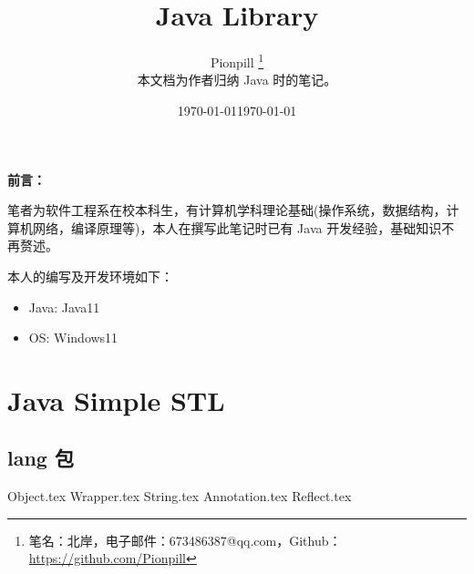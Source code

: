 \documentclass{PionpillNote-book}
\title{Java Library}
\author{
    Pionpill \footnote{笔名：北岸，电子邮件：673486387@qq.com，Github：\url{https://github.com/Pionpill}} \\
    本文档为作者归纳 Java 时的笔记。\\
}
\date{\today}
\begin{document}
\pagestyle{plain}
\maketitle

\noindent\textbf{前言：}

笔者为软件工程系在校本科生，有计算机学科理论基础(操作系统，数据结构，计算机网络，编译原理等)，本人在撰写此笔记时已有 Java 开发经验，基础知识不再赘述。

本人的编写及开发环境如下：
\begin{itemize}
    \item Java: Java11
    \item OS: Windows11
\end{itemize}

\date{\today}
\newpage

\tableofcontents

\newpage

\setcounter{page}{1} 
\pagestyle{fancy}

\part{Java Simple STL}
\chapter{lang 包}
{Object.tex}
{Wrapper.tex}
{String.tex}
{Annotation.tex}
{Reflect.tex}
\end{document}
